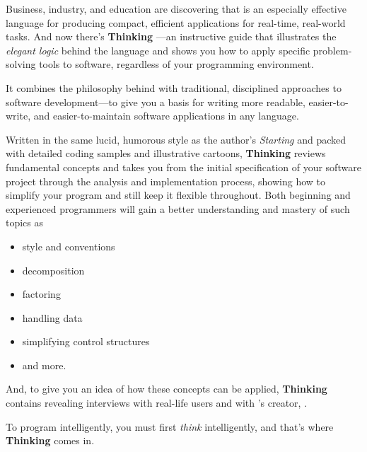 
\noindent
Business, industry, and education are discovering that \Forth{} is an
especially effective language for producing compact, efficient
applications for real-time, real-world tasks. And now there's
\textbf{Thinking \Forth}---an instructive guide that illustrates the
\emph{elegant logic} behind the language and shows you how to apply
specific problem-solving tools to software, regardless of your
programming environment.

It combines the philosophy behind \Forth{} with traditional,
disciplined approaches to software development---to give you a basis
for writing more readable, easier-to-write, and easier-to-maintain
software applications in any language.

Written in the same lucid, humorous style as the author's
\emph{Starting \Forth} and packed with detailed coding samples and
illustrative cartoons, \textbf{Thinking \Forth} reviews fundamental
\Forth{} concepts and takes you from the initial specification of your
software project through the analysis and implementation process,
showing how to simplify your program and still keep it flexible
throughout. Both beginning and experienced programmers will gain a
better understanding and mastery of such topics as
\begin{itemize}
\item \Forth{} style and conventions
\item decomposition
\item factoring
\item handling data
\item simplifying control structures
\item and more.
\end{itemize}

And, to give you an idea of how these concepts can be applied,
\textbf{Thinking \Forth} contains revealing interviews with real-life
users and with \Forth's creator, .

To program intelligently, you must first \emph{think} intelligently,
and that's where \textbf{Thinking \Forth} comes in.

